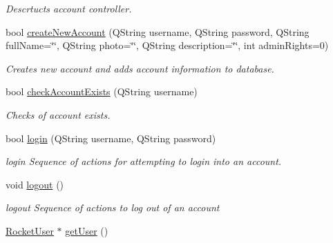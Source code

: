 \begin{DoxyCompactItemize}
\begin{DoxyCompactList}\small\item\em Descrtucts account controller. \end{DoxyCompactList}\item 
bool \hyperlink{classAccountController_ae0cde2e3eb66f23840d330c9f305dae5}{create\+New\+Account} (Q\+String username, Q\+String password, Q\+String full\+Name=\char`\"{}\char`\"{}, Q\+String photo=\char`\"{}\char`\"{}, Q\+String description=\char`\"{}\char`\"{}, int admin\+Rights=0)
\begin{DoxyCompactList}\small\item\em Creates new account and adds account information to database. \end{DoxyCompactList}\item 
bool \hyperlink{classAccountController_a3597e3f59d0cddceefca6eeb4edadfd3}{check\+Account\+Exists} (Q\+String username)
\begin{DoxyCompactList}\small\item\em Checks of account exists. \end{DoxyCompactList}\item 
bool \hyperlink{classAccountController_a10e8731d5d875c5f13a0628695843de6}{login} (Q\+String username, Q\+String password)
\begin{DoxyCompactList}\small\item\em login Sequence of actions for attempting to login into an account. \end{DoxyCompactList}\item 
void \hyperlink{classAccountController_a738ac29136e24810dad3f9aec80ce18c}{logout} ()
\begin{DoxyCompactList}\small\item\em logout Sequence of actions to log out of an account \end{DoxyCompactList}\item 
\hyperlink{classRocketUser}{Rocket\+User} $\ast$ \hyperlink{classAccountController_a22ef52c3a2c18d6db6f52f78b89e0a94}{get\+User} ()\hypertarget{classAccountController_a22ef52c3a2c18d6db6f52f78b89e0a94}{}\label{classAccountController_a22ef52c3a2c18d6db6f52f78b89e0a94}


\end{DoxyCompactItemize}
